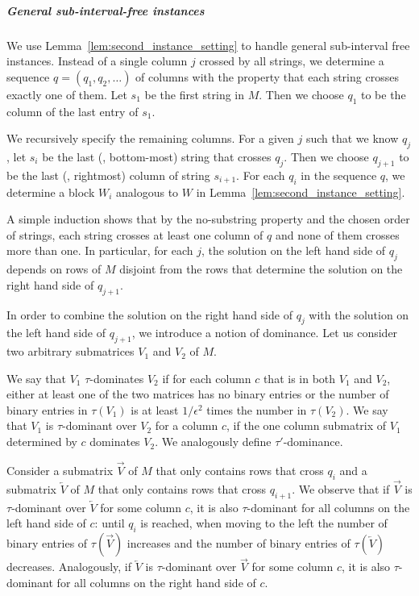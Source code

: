 \subparagraph{General sub-interval-free instances} 
We use Lemma~\ref{lem:second_instance_setting} to handle general sub-interval free instances.
Instead of a single column $j$ crossed by all strings, we determine a sequence $q = (q_1,q_2,\dotsc)$ of columns with the property that each string crosses exactly one of them.
Let $s_1$ be the first string in $M$.
Then we choose $q_1$ to be the column of the last entry of $s_1$.

We recursively specify the remaining columns.
For a given $j$ such that we know $q_j$, let $s_i$ be the last (\ie, bottom-most) string that crosses $q_j$.
Then we choose $q_{j+1}$ to be the last (\ie, rightmost) column of string $s_{i+1}$.
For each $q_i$ in the sequence $q$, we determine a block $W_i$ analogous to $W$ in Lemma~\ref{lem:second_instance_setting}.

A simple induction shows that by the no-substring property and the chosen order of strings, each string crosses at least one column of $q$ and none of them crosses more than one.
In particular, for each $j$, the solution on the left hand side of $q_j$ depends on rows of $M$ disjoint from the rows that determine the solution on the right hand side of $q_{j+1}$. 

In order to combine the solution on the right hand side of $q_j$ with the solution on the left hand side of $q_{j+1}$, we introduce a notion of dominance.
Let us consider two arbitrary submatrices $V_1$ and $V_2$ of $M$.
\begin{definition}[Dominance]
    \label{def:dominance}
    We say that $V_1$ $\tau$-dominates $V_2$ if for each column $c$ that is in both $V_1$ and $V_2$, either at least one of the two matrices has no binary entries or
    the number of binary entries in $\tau(V_1)$ is at least $1/\epsilon^2$ times the number in $\tau(V_2)$.
    We say that $V_1$ is $\tau$-dominant over $V_2$ for a column $c$, if the one column submatrix of $V_1$ determined by $c$ dominates $V_2$. 
%
    We analogously define $\tau'$-dominance.
\end{definition}

Consider a submatrix $\overrightarrow{V}$ of $M$ that only contains rows that cross $q_i$ and a submatrix $\overleftarrow{V}$ of $M$ that only contains rows that cross $q_{i+1}$.
We observe that if $\overrightarrow{V}$ is $\tau$-dominant over $\overleftarrow{V}$ for some column $c$, it is also $\tau$-dominant for all columns on the left hand side of $c$:
until $q_i$ is reached, when moving to the left the number of binary entries of $\tau(\overrightarrow{V})$ increases and the number of binary entries of $\tau(\overleftarrow{V})$ decreases.
Analogously, if $\overleftarrow{V}$ is $\tau$-dominant over $\overrightarrow{V}$ for some column $c$, it is also $\tau$-dominant for all columns on the right hand side of $c$.

